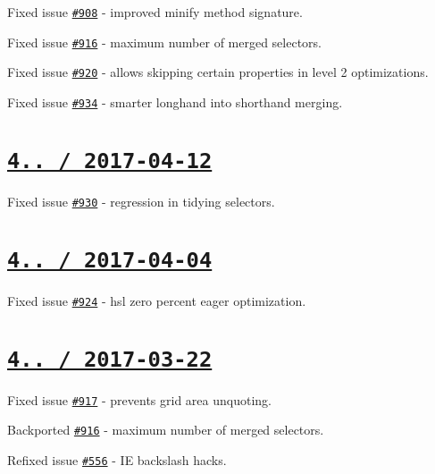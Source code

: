 \begin{DoxyItemize}
\item Fixed issue \href{https://github.com/jakubpawlowicz/clean-css/issues/908}{\tt \#908} -\/ improved {\ttfamily minify} method signature.
\item Fixed issue \href{https://github.com/jakubpawlowicz/clean-css/issues/916}{\tt \#916} -\/ maximum number of merged selectors.
\item Fixed issue \href{https://github.com/jakubpawlowicz/clean-css/issues/920}{\tt \#920} -\/ allows skipping certain properties in level 2 optimizations.
\item Fixed issue \href{https://github.com/jakubpawlowicz/clean-css/issues/934}{\tt \#934} -\/ smarter longhand into shorthand merging.
\end{DoxyItemize}

\section*{\href{https://github.com/jakubpawlowicz/clean-css/compare/v4.0.11...v4.0.12}{\tt 4.. / 2017-\/04-\/12} }


\begin{DoxyItemize}
\item Fixed issue \href{https://github.com/jakubpawlowicz/clean-css/issues/930}{\tt \#930} -\/ regression in tidying selectors.
\end{DoxyItemize}

\section*{\href{https://github.com/jakubpawlowicz/clean-css/compare/v4.0.10...v4.0.11}{\tt 4.. / 2017-\/04-\/04} }


\begin{DoxyItemize}
\item Fixed issue \href{https://github.com/jakubpawlowicz/clean-css/issues/924}{\tt \#924} -\/ {\ttfamily hsl} zero percent eager optimization.
\end{DoxyItemize}

\section*{\href{https://github.com/jakubpawlowicz/clean-css/compare/v4.0.9...v4.0.10}{\tt 4.. / 2017-\/03-\/22} }


\begin{DoxyItemize}
\item Fixed issue \href{https://github.com/jakubpawlowicz/clean-css/issues/917}{\tt \#917} -\/ prevents grid area unquoting.
\item Backported \href{https://github.com/jakubpawlowicz/clean-css/issues/916}{\tt \#916} -\/ maximum number of merged selectors.
\item Refixed issue \href{https://github.com/jakubpawlowicz/clean-css/issues/556}{\tt \#556} -\/ IE backslash hacks.
\end{DoxyItemize}

